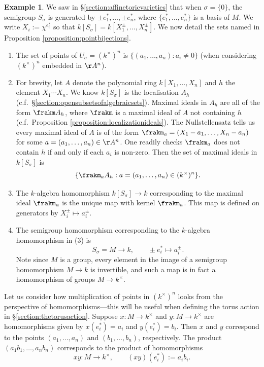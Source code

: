 \documentclass[12pt]{amsart}
\theoremstyle{plain}
\theoremstyle{definition}
\newtheorem{example}[theorem]{Example}
\begin{document}
\begin{example}
We saw in \S \ref{section:affinetoricvarieties} that when $\sigma = \{0\}$, the semigroup $S_\sigma$ is generated by $\pm e_1^*, \ldots, \pm e_n^*$, where $\{e_1^*, \ldots, e_n^*\}$ is a basis of $M$.
We write $X_i := \chi^{e_i^*}$ so that $k[S_\sigma] = k[X_1^{\pm}, \ldots, X_n^\pm]$.
We now detail the sets named in Proposition \ref{proposition:pointbijections}.
\begin{enumerate}
\item The set of points of $U_\sigma = (k^\times)^n$ is $\{(a_1, \ldots, a_n) : a_i \ne 0\}$ (when considering $(k^\times)^n$ embedded in $\AA^n$).
\item For brevity, let $A$ denote the polynomial ring $k[X_1, \ldots, X_n]$ and $h$ the element $X_1 \cdots X_n$.
We know $k[S_\sigma]$ is the localisation $A_h$ (c.f.\ \S\ref{section:opensubsetsofalgebraicsets}).
Maximal ideals in $A_h$ are all of the form $\frakm A_h$, where $\frakm$ is a maximal ideal of $A$ not containing $h$ (c.f.\ Proposition \ref{proposition:localizationideals}).
The Nullstellensatz tells us every maximal ideal of $A$ is of the form $\frakm_a = (X_1 - a_1, \ldots, X_n - a_n)$ for some $a = (a_1, \ldots, a_n) \in \AA^n$.
One readily checks $\frakm_a$ does not contain $h$ if and only if each $a_i$ is non-zero.
Then the set of maximal ideals in $k[S_\sigma]$ is $$\{\frakm_a A_h : a = (a_1, \ldots, a_n) \in (k^\times)^n\}.$$
\item The $k$-algebra homomorphism $k[S_\sigma] \to k$ corresponding to the maximal ideal $\frakm_a$ is the unique map with kernel $\frakm_a$.
This map is defined on generators by $X_i^\pm \mapsto a_i^\pm$.
\item The semigroup homomorphism corresponding to the $k$-algebra homomorphism in (3) is
$$S_\sigma = M \to k, \qquad \pm e_i^* \mapsto a_i^\pm.$$
Note since $M$ is a group, every element in the image of a semigroup homomorphism $M \to k$ is invertible, and such a map is in fact a homomorphism of groups $M \to k^\times$.
\end{enumerate}
\end{example}

Let us consider how multiplication of points in $(k^\times)^n$ looks from the perspective of homomorphisms---this will be useful when defining the torus action in \S \ref{section:thetorusaction}.
Suppose $x : M \to k^\times$ and $y : M \to k^\times$ are homomorphisms given by $x(e_i^*) = a_i$ and $y(e_i^*) = b_i$.
Then $x$ and $y$ correspond to the points $(a_1, \ldots, a_n)$ and $(b_1, \ldots, b_n)$, respectively.
The product $(a_1 b_1, \ldots, a_n b_n)$ corresponds to the product of homomorphisms
$$xy : M \to k^\times, \qquad (xy)(e_i^*) := a_i b_i.$$
\end{document}
